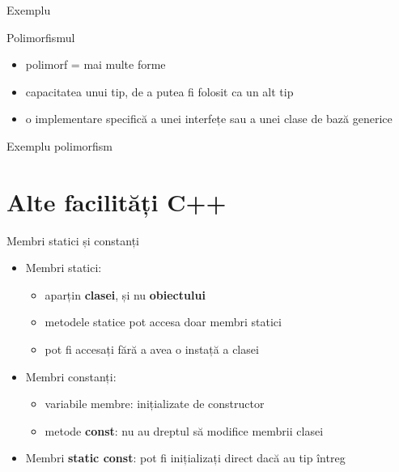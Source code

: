 \documentclass{beamer}
\begin{document}
\begin{frame}{Exemplu}
  \footnotesize{}
\end{frame}

\begin{frame}{Polimorfismul}
  \begin{itemize}
  \item polimorf = mai multe forme 
  \item capacitatea unui tip, de a putea fi folosit ca un alt tip
  \item o implementare specifică a unei interfețe sau a unei clase de bază generice
  \end{itemize}
\end{frame}

\begin{frame}{Exemplu polimorfism}
  \footnotesize{}
\end{frame}

\section{Alte facilități C++}

\begin{frame}{Membri statici și constanți}
 \begin{itemize}
  \item Membri statici:
  \begin{itemize}
  \item aparțin \textbf{clasei}, și nu \textbf{obiectului}
  \item metodele statice pot accesa doar membri statici
  \item pot fi accesați fără a avea o instață a clasei
  \end{itemize}       
  \item Membri constanți: 
   \begin{itemize}
    \item variabile membre: inițializate de constructor
	\item metode \textbf{const}: nu au dreptul să modifice membrii clasei
   \end{itemize}
   \item Membri \textbf{static const}: pot fi inițializați direct dacă au tip întreg
   \end{itemize}
\end{frame}
\end{document}
